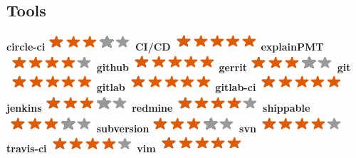 \documentclass[]{friggeri-cv}
\begin{document}
\begin{aside}
    \section{Tools}
        \textbf{circle-ci}\includegraphics[scale=0.40]{img/3stars.png}
        \textbf{CI/CD}\includegraphics[scale=0.40]{img/5stars.png}
        \textbf{explainPMT}\includegraphics[scale=0.40]{img/4stars.png}
        \textbf{github}\includegraphics[scale=0.40]{img/5stars.png}
        \textbf{gerrit}\includegraphics[scale=0.40]{img/3stars.png}
        \textbf{git}\includegraphics[scale=0.40]{img/5stars.png}
        \textbf{gitlab}\includegraphics[scale=0.40]{img/5stars.png}
        \textbf{gitlab-ci}\includegraphics[scale=0.40]{img/5stars.png}
        \textbf{jenkins}\includegraphics[scale=0.40]{img/3stars.png}
        \textbf{redmine}\includegraphics[scale=0.40]{img/4stars.png}
        \textbf{shippable}\includegraphics[scale=0.40]{img/3stars.png}
        \textbf{subversion}\includegraphics[scale=0.40]{img/3stars.png}
        \textbf{svn}\includegraphics[scale=0.40]{img/4stars.png}
        \textbf{travis-ci}\includegraphics[scale=0.40]{img/4stars.png}
        \textbf{vim}\includegraphics[scale=0.40]{img/5stars.png}
\end{aside}
\end{document}
